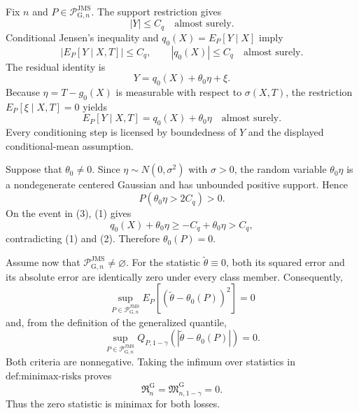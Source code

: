 Fix \(n\) and \(P\in\mathcal P_{\mathrm G,n}^{\mathrm{JMS}}\).  The support restriction gives
\[
 |Y|\le C_q\quad\text{almost surely}.
\]
Conditional Jensen's inequality and \(q_0(X)=E_P[Y\mid X]\) imply
\[
 |E_P[Y\mid X,T]|\le C_q,
 \qquad
 |q_0(X)|\le C_q
 \quad\text{almost surely}. \tag{1}
\]
The residual identity is
\[
 Y=q_0(X)+\theta_0\eta+\xi.
\]
Because \(\eta=T-g_0(X)\) is measurable with respect to \(\sigma(X,T)\), the restriction
\(E_P[\xi\mid X,T]=0\) yields
\[
 E_P[Y\mid X,T]=q_0(X)+\theta_0\eta
 \quad\text{almost surely}. \tag{2}
\]
Every conditioning step is licensed by boundedness of \(Y\) and the displayed conditional-mean assumption.

Suppose that \(\theta_0\ne0\).  Since \(\eta\sim N(0,\sigma^2)\) with
\(\sigma>0\), the random variable \(\theta_0\eta\) is a nondegenerate centered Gaussian and has unbounded positive support.  Hence
\[
 P(\theta_0\eta>2C_q)>0. \tag{3}
\]
On the event in (3), (1) gives
\[
 q_0(X)+\theta_0\eta
 \ge-C_q+\theta_0\eta>C_q,
\]
contradicting (1) and (2).  Therefore \(\theta_0(P)=0\).

Assume now that \(\mathcal P_{\mathrm G,n}^{\mathrm{JMS}}\ne\varnothing\).  For the statistic \(\widetilde\theta\equiv0\), both its squared error and its absolute error are identically zero under every class member.  Consequently,
\[
 \sup_{P\in\mathcal P_{\mathrm G,n}^{\mathrm{JMS}}}
 E_P[(\widetilde\theta-\theta_0(P))^2]=0
\]
and, from the definition of the generalized quantile,
\[
 \sup_{P\in\mathcal P_{\mathrm G,n}^{\mathrm{JMS}}}
 Q_{P,1-\gamma}(|\widetilde\theta-\theta_0(P)|)=0.
\]
Both criteria are nonnegative.  Taking the infimum over statistics in
\(\text{def:minimax-risks}\) proves
\[
 \mathfrak R_n^{\mathrm G}
 =\mathfrak M_{n,1-\gamma}^{\mathrm G}
 =0.
\]
Thus the zero statistic is minimax for both losses.